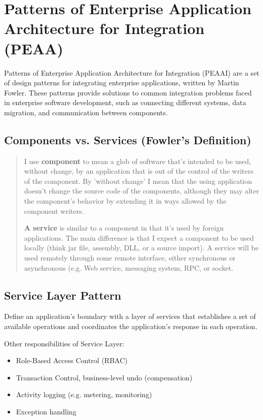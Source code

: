 \section{Patterns of Enterprise Application Architecture for Integration (PEAA)}
Patterns of Enterprise Application Architecture for Integration (PEAAI) are a set of design patterns for integrating enterprise applications, written by Martin Fowler. These patterns provide solutions to common integration problems faced in enterprise software development, such as connecting different systems, data migration, and communication between components.

\subsection{Components vs. Services (Fowler's Definition)}
\begin{quote}
  I use \textbf{component} to mean a glob of software that's intended to be used, without change, by an application that is out of the control of the writers of the component. By 'without change' I mean that the using application doesn't change the source code of the components, although they may alter the component's behavior by extending it in ways allowed by the component writers.

  \textbf{A service} is similar to a component in that it's used by foreign applications. The main difference is that I expect a component to be used locally (think jar file, assembly, DLL, or a source import). A service will be used remotely through some remote interface, either synchronous or asynchronous (e.g. Web service, messaging system, RPC, or socket.
\end{quote}

\subsection{Service Layer Pattern}
Define an application's boundary with a layer of services that establishes a set of available operations and coordinates the application's response in each operation.

Other responsibilities of Service Layer:
\begin{itemize}
  \item Role-Based Access Control (RBAC)
  \item Transaction Control, business-level undo (compensation)
  \item Activity logging (e.g. metering, monitoring)
  \item Exception handling
\end{itemize}

